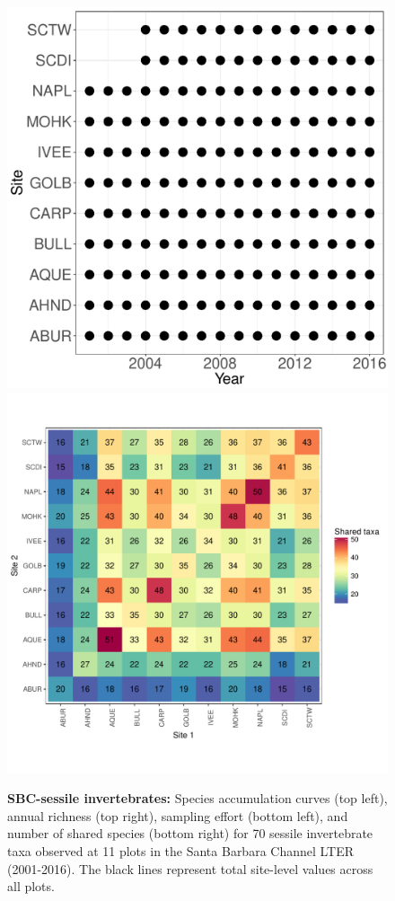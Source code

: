 \documentclass[11pt, oneside]{article}
\begin{document}
\begin{figure}[h!]
\includegraphics[scale = 0.4]{sbc-sessileInverts-castorani_spatiotemporal_sampling_effort.pdf}
\includegraphics[scale = 0.4]{sbc-sessileInverts-castorani_spp_shared.pdf}
\caption{{\bf SBC-sessile invertebrates:} Species accumulation curves (top left),  annual richness (top right), sampling effort (bottom left), and number of shared species (bottom right)  for 70 sessile invertebrate taxa observed at 11 plots in the Santa Barbara Channel LTER (2001-2016). The black lines represent total site-level values across all plots.}
\label{sbc-sessileInverts}
\end{figure}
\end{document}
